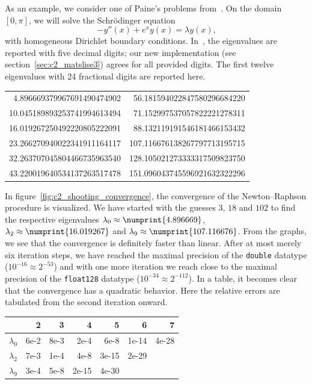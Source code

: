 As an example, we consider one of Paine's problems from~\cite{paine_correction_1981}. On the domain $[0, \pi]$, we will solve the Schrödinger equation
\begin{equation}\label{ref:equ_shooting_paine}
    -y''(x) + e^x y(x) = \lambda y(x)\text{,}
\end{equation}
with homogeneous Dirichlet boundary conditions. In~\cite{paine_correction_1981}, the eigenvalues are reported with five decimal digits; our new implementation  (see section~\ref{sec:c2_matslise3}) agrees for all provided digits. The first twelve eigenvalues with 24 fractional digits are reported here.
\begin{center}
    \begin{tabular}{n{2}{24}n{3}{24}}
        4.896669379967691490474902  & 56.181594022847580296684220  \\
        10.045189893253741994613494 & 71.152997537057822221278311  \\
        16.019267250492220805222091 & 88.132119191546181466153432  \\
        23.266270940022341911164117 & 107.116676138267797713195715 \\
        32.263707045804466735963540 & 128.105021273333317509823750 \\
        43.220019640534137263517478 & 151.096043745596921632322296
    \end{tabular}
\end{center}

In figure~\ref{fig:c2_shooting_convergence}, the convergence of the Newton--Raphson procedure is visualized. We have started with the guesses $3$, $18$ and $102$ to find the respective eigenvalues $\lambda_0 \approx \numprint{4.896669}$, $\lambda_2 \approx \numprint{16.019267}$  and $\lambda_9 \approx \numprint{107.116676}$. From the graphs, we see that the convergence is definitely faster than linear. After at most merely six iteration steps, we have reached the maximal precision of the \texttt{double} datatype ($10^{-16} \approx 2^{-53}$) and with one more iteration we reach close to the maximal precision of the \texttt{float128} datatype ($10^{-34} \approx 2^{-112}$). In a table, it becomes clear that the convergence has a quadratic behavior. Here the relative errors are tabulated from the second iteration onward.

\begin{center}
    \begin{tabular}{r|n{1}{0}n{1}{0}n{1}{0}n{1}{0}n{1}{0}n{1}{0}}
                                     & {2}  & {3}  & {4}   & {5}   & {6}   & {7}   \\
        \hline
        \rule{0pt}{2.6ex}$\lambda_0$ & 6e-2 & 8e-3 & 2e-4  & 6e-8  & 1e-14 & 4e-28 \\
        $\lambda_2$                  & 7e-3 & 1e-4 & 4e-8  & 3e-15 & 2e-29 &       \\
        $\lambda_9$                  & 3e-4 & 5e-8 & 2e-15 & 4e-30 &       &       \\
    \end{tabular}
\end{center}

